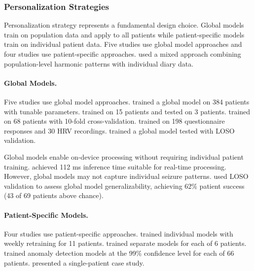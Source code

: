 \subsubsection{Personalization Strategies}

Personalization strategy represents a fundamental design choice. Global models train on population data and apply to all patients while patient-specific models train on individual patient data. Five studies use global model approaches and four studies use patient-specific approaches. \textcite{vielufSeizureMonitoringCombined2025} used a mixed approach combining population-level harmonic patterns with individual diary data.

\paragraph{Global Models.}
Five studies use global model approaches. \textcite{spahrDeepLearningbasedDetection2025} trained a global model on 384 patients with tunable parameters. \textcite{fineDetectionKeyAutomated2025} trained on 15 patients and tested on 3 patients. \textcite{dongTwoLayerEnsembleMethod2022} trained on 68 patients with 10-fold cross-validation. \textcite{elemamAutomatedValidatedTool2025} trained on 198 questionnaire responses and 30 HRV recordings. \textcite{meiselMachineLearningWristband2020} trained a global model tested with LOSO validation.

Global models enable on-device processing without requiring individual patient training. \textcite{spahrDeepLearningbasedDetection2025} achieved 112 ms inference time suitable for real-time processing. However, global models may not capture individual seizure patterns. \textcite{meiselMachineLearningWristband2020} used LOSO validation to assess global model generalizability, achieving 62\% patient success (43 of 69 patients above chance).

\paragraph{Patient-Specific Models.}
Four studies use patient-specific approaches. \textcite{stirlingForecastingSeizureLikelihood2021} trained individual models with weekly retraining for 11 patients. \textcite{nasseriAmbulatorySeizureForecasting2021} trained separate models for each of 6 patients. \textcite{odeDevelopmentEpilepticSeizure2023} trained anomaly detection models at the 99\% confidence level for each of 66 patients. \textcite{singhrathoreDevelopmentMultimodalMachine2024} presented a single-patient case study.


